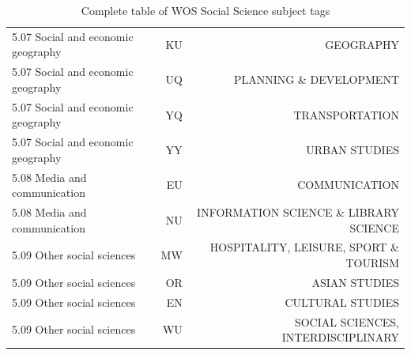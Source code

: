 \documentclass[12pt, a4paper]{article}
\begin{document}
\begin{table}[H]
\begin{adjustbox}{center}
\begin{tabular}{l|rr}
			5.07 Social and economic geography & KU & GEOGRAPHY                                 \\
			5.07 Social and economic geography & UQ & PLANNING \& DEVELOPMENT                   \\
			5.07 Social and economic geography & YQ & TRANSPORTATION                            \\
			5.07 Social and economic geography & YY & URBAN STUDIES                             \\
			5.08 Media and communication       & EU & COMMUNICATION                             \\
			5.08 Media and communication       & NU & INFORMATION SCIENCE \& LIBRARY SCIENCE    \\
			5.09 Other social sciences         & MW & HOSPITALITY, LEISURE, SPORT \& TOURISM    \\
			5.09 Other social sciences         & OR & ASIAN STUDIES                             \\
			5.09 Other social sciences         & EN & CULTURAL STUDIES                          \\
			5.09 Other social sciences         & WU & SOCIAL SCIENCES, INTERDISCIPLINARY    \\
			\bottomrule
		\end{tabular}
	\end{adjustbox}
	\caption{Complete table of WOS Social Science subject tags}\label{sum_1}
\end{table}
\end{document}
